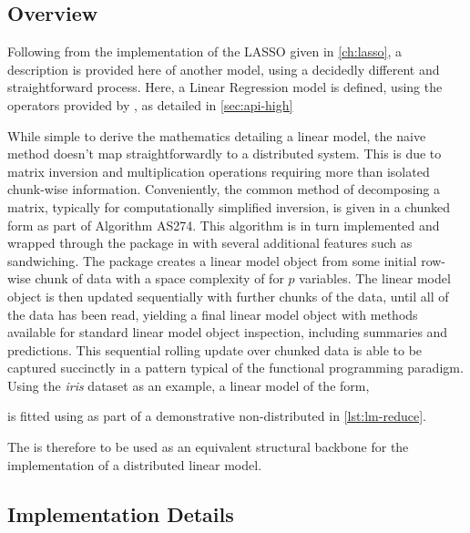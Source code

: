 \subsection{Overview}

Following from the implementation of the LASSO given in \cref{ch:lasso}, a description is provided here of another model, using a decidedly different and straightforward process.
Here, a Linear Regression model is defined, using the operators provided by \lso{}, as detailed in \cref{sec:api-high}

While simple to derive the mathematics detailing a linear model, the naive method doesn't map straightforwardly to a distributed system.
This is due to matrix inversion and multiplication operations requiring more than isolated chunk-wise information.
Conveniently, the common method of decomposing a matrix, typically for computationally simplified inversion, is given in a chunked form as part of Algorithm AS274\cite{miller1992as274}.
This algorithm is in turn implemented and wrapped through the  package in \R{} with several additional features such as sandwiching\cite{lumley2013biglm}.
The  package creates a linear model object from some initial row-wise chunk of data with a space complexity of  for $p$ variables.
The linear model object is then updated sequentially with further chunks of the data, until all of the data has been read, yielding a final linear model object with methods available for standard linear model object inspection, including summaries and predictions.
This sequential rolling update over chunked data is able to be captured succinctly in a  pattern typical of the functional programming paradigm.
Using the \textit{iris} dataset as an example, a linear model of the form,


is fitted using  as part of a demonstrative non-distributed  in \cref{lst:lm-reduce}.


The  is therefore to be used as an equivalent structural backbone for the implementation of a distributed linear model.

\subsection{Implementation Details}

